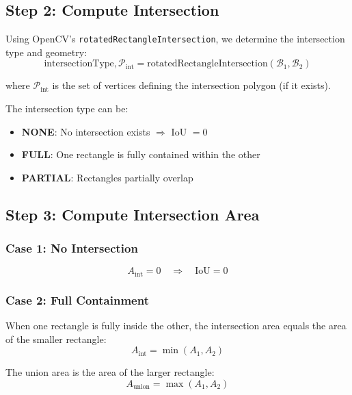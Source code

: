 \documentclass[11pt]{article}
\begin{document}
\subsection{Step 2: Compute Intersection}

Using OpenCV's \texttt{rotatedRectangleIntersection}, we determine the intersection type and geometry:
\begin{equation}
\text{intersectionType}, \mathcal{P}_{\text{int}} = \text{rotatedRectangleIntersection}(\mathcal{B}_1, \mathcal{B}_2)
\end{equation}

where $\mathcal{P}_{\text{int}}$ is the set of vertices defining the intersection polygon (if it exists).

The intersection type can be:
\begin{itemize}[nosep]
    \item \textbf{NONE}: No intersection exists $\Rightarrow$ IoU $= 0$
    \item \textbf{FULL}: One rectangle is fully contained within the other
    \item \textbf{PARTIAL}: Rectangles partially overlap
\end{itemize}

\subsection{Step 3: Compute Intersection Area}

\subsubsection{Case 1: No Intersection}
\begin{equation}
A_{\text{int}} = 0 \quad \Rightarrow \quad \text{IoU} = 0
\end{equation}

\subsubsection{Case 2: Full Containment}

When one rectangle is fully inside the other, the intersection area equals the area of the smaller rectangle:
\begin{equation}
A_{\text{int}} = \min(A_1, A_2)
\end{equation}

The union area is the area of the larger rectangle:
\begin{equation}
A_{\text{union}} = \max(A_1, A_2)
\end{equation}
\end{document}
